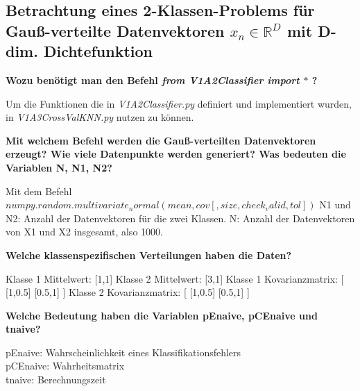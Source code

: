 \subsection{Betrachtung eines 2-Klassen-Problems für Gauß-verteilte Datenvektoren $x_n \in \mathbb{R}^D$ mit D-dim. Dichtefunktion}

\vspace{5px}
\noindent
\textbf{Wozu benötigt man den Befehl \textit{from V1A2\textunderscore Classifier import $\ast$ }?}

\vspace{5px}
\noindent
Um die Funktionen die in \textit{V1A2\textunderscore Classifier.py} definiert und implementiert wurden, in \textit{V1A3\textunderscore CrossVal\textunderscore KNN.py} nutzen zu können. 

\vspace{5px}
\noindent
\textbf{Mit welchem Befehl werden die Gauß-verteilten Datenvektoren erzeugt?
Wie viele Datenpunkte werden generiert? Was bedeuten die Variablen N, N1, N2?}

\vspace{5px}
\noindent
Mit dem Befehl
\textit{$numpy.random.multivariate_normal(mean, cov[, size, check_valid, tol])$}
N1 und N2: Anzahl der Datenvektoren für die zwei Klassen. 
N: Anzahl der Datenvektoren von X1 und X2 insgesamt, also 1000.

\vspace{5px}
\noindent
\textbf{Welche klassenspezifischen Verteilungen haben die Daten?}

\vspace{5px}
\noindent
Klasse 1 Mittelwert: [1,1]
Klasse 2 Mittelwert: [3,1]
Klasse 1 Kovarianzmatrix: [ [1,0.5] [0.5,1] ]
Klasse 2 Kovarianzmatrix: [ [1,0.5] [0.5,1] ]

\vspace{5px}
\noindent
\textbf{Welche Bedeutung haben die Variablen pE\textunderscore naive,
pCE\textunderscore naive und t\textunderscore naive?}

\vspace{5px}
\noindent
pE\textunderscore naive: Wahrscheinlichkeit eines Klassifikationsfehlers\\
pCE\textunderscore naive: Wahrheitsmatrix\\
t\textunderscore naive: Berechnungszeit\\

